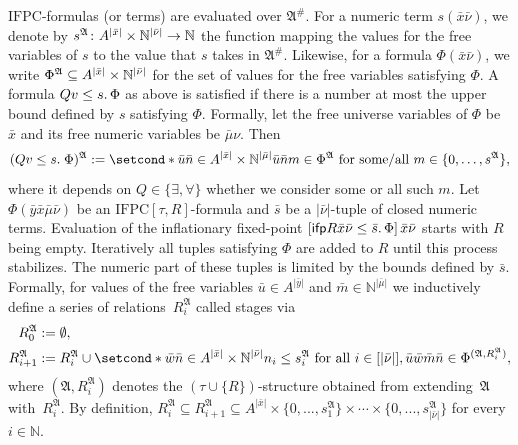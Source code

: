 \documentclass[]{lmcs}
\newcommand{\nat}{\mathbb{N}}
\newcommand{\qspace}{\mathchoice{\;}{\,}{}{}}
\newcommand{\set}[1]{\lbrace #1 \rbrace}
\newcommand{\numVarA}{\nu}
\newcommand{\numVarB}{\mu}
\newcommand{\uniVarA}{x}
\newcommand{\uniVarB}{y}
\newcommand{\varVec}[1]{\bar{#1}}
\newcommand{\numVarVA}{\varVec{\numVarA}}
\newcommand{\numVarVB}{\varVec{\numVarB}}
\newcommand{\uniVarVA}{\varVec{\uniVarA}}
\newcommand{\uniVarVB}{\varVec{\uniVarB}}
\newcommand{\termA}{s}
\newcommand{\formA}{\Phi}
\newcommand{\rel}{R}
\newcommand{\tup}[1]{\bar{#1}}
\newcommand{\Struct}{\mathfrak{A}}
\newcommand{\StructV}{A}
\newcommand{\vertA}{u}
\newcommand{\vertC}{w}
\newcommand{\countingExt}[1]{#1^{\#}}
\newcommand{\StructA}{\mathfrak{A}}
\newcommand{\sig}{\tau}
\newcommand{\IFPC}{\ensuremath{\mathrm{IFPC}}}
\newcommand{\ifp}{\mathsf{ifp}}
\begin{document}
\IFPC{}-formulas (or terms) are evaluated over $\countingExt{\Struct}$.
For a numeric term $\termA(\uniVarVA\numVarVA)$, we denote by
$\eval{\Struct}{\termA} \colon \StructV^{|\uniVarVA|} \times \nat^{|\numVarVA|} \to \nat$
the function mapping the values for the free variables of $\termA$
to the value that $\termA$ takes in $\countingExt{\Struct}$.
Likewise, for a formula $\formA(\uniVarVA\numVarVA)$,
we write $\eval{\Struct}{\formA} \subseteq \StructV^{|\uniVarVA|} \times \nat^{|\numVarVA|}$ for the set of values for the free variables
satisfying $\formA$.
A formula $Qv \leq s.\qspace \formA$ as above is satisfied if there is a number at most the upper bound defined by $s$ satisfying $\formA$.
Formally, let the free universe variables of $\formA$ be $\uniVarVA$
and its free numeric variables be $\numVarVB\numVarA$.
Then
\[\eval{\Struct}{(Qv \leq s.\qspace \formA)} := \setcond*{\tup{\vertA}\tup{n} \in A^{|\uniVarVA|} \times \nat^{|\numVarVB|} } { \tup{\vertA}\tup{n}m \in \eval{\Struct}{\formA}\text{ for some/all } m \in \set{0,\dots, s^\StructA}},\]
where it depends on $Q \in \set{\exists,\forall}$ whether we consider some or all such $m$.
Let $\formA(\uniVarVB\uniVarVA\numVarVB\numVarVA)$ be an $\IFPC{}[\sig,R]$-formula and 
$\tup{\termA}$ be a $|\numVarVA|$-tuple  of closed numeric terms.
Evaluation of the inflationary fixed-point $\left[\ifp \rel \uniVarVA\numVarVA \leq \tup{\termA}.\qspace\formA \right]\uniVarVA\numVarVA$
starts with $\rel$ being empty.
Iteratively all tuples satisfying $\formA$ are added to $\rel$ until this process stabilizes.
The numeric part of these tuples is limited by the bounds defined by $\tup{\termA}$.
Formally, for values of the free variables
$\tup{\vertA} \in \StructV^{|\uniVarVB|}$ and $\tup{m} \in \nat^{|\numVarVB|}$
we inductively define a series of relations~$\rel_i^\Struct$
called stages via
\begin{align*}
	\rel^\Struct_0 &:= \emptyset,\\
	\rel^\Struct_{i+1} &:= \rel_i^\Struct \cup 
	\setcond*{\tup{\vertC}\tup{n} \in \StructV^{|\uniVarVA|} \times \nat^{|\numVarVA|}}{n_i \leq \termA_i^\StructA \text{ for all } i \in [|\numVarVA|] , \tup{\vertA}\tup{\vertC}\tup{m}\tup{n} \in \eval{(\Struct, \rel_i^\Struct)}{\formA}},
\end{align*}
where $(\Struct, \rel_i^\Struct)$ denotes the $(\sig \cup \set{\rel})$-structure
obtained from extending~$\Struct$ with~$\rel_i^\Struct$.
By definition, $\rel_i^\Struct \subseteq \rel_{i+1}^\Struct \subseteq \StructV^{|\uniVarVA|} \times \set{0,...,\termA_1^\Struct} \times \cdots \times \set{0,...,\termA_{|\numVarVA|}^\Struct}$ for every $i \in \nat$.
\end{document}
